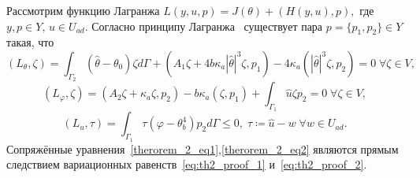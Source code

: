 Рассмотрим функцию Лагранжа $L(y,u,p) = J(\theta) + (H(y,u),p),$ где $y,p \in Y,\, u \in U_{ad}$.
Согласно принципу Лагранжа~\cite[Гл.2, Теорема 1.5]{theorem_proof_18}
существует пара $p = \{p_1,p_2\} \in Y$ такая, что
\begin{equation}
    \label{eq:th2_proof_1}
    (L_\theta,\zeta) =\int_{\Gamma_2}(\hat\theta -\theta_0) \zeta d\Gamma
    + (A_1 \zeta + 4b\kappa_a |\hat\theta|^3 \zeta,p_1)
    - 4\kappa_a(|\hat\theta|^3 \zeta,p_2) = 0 \; \forall \zeta \in V,
\end{equation}
\begin{equation}
    \label{eq:th2_proof_2}
    (L_\varphi, \zeta) = (A_2 \zeta + \kappa_a \zeta, p_2)
    - b \kappa_a(\zeta,p_1) +\int_{\Gamma_1} \hat u \zeta p_2 = 0 \; \forall \zeta \in V,
\end{equation}
\begin{equation}
    \label{eq:th2_proof_3}
    (L_u,\tau) = \int_{\Gamma_1} \tau (\varphi - \theta^4_b) p_2 d\Gamma  \leq 0,
    \; \tau \coloneqq \hat u - w \; \forall w \in U_{ad}.
\end{equation}
Сопряжённые уравнения~\eqref{therorem_2_eq1},\eqref{therorem_2_eq2}
являются прямым следствием
вариационных равенств~\eqref{eq:th2_proof_1} и~\eqref{eq:th2_proof_2}.
\FloatBarrier
